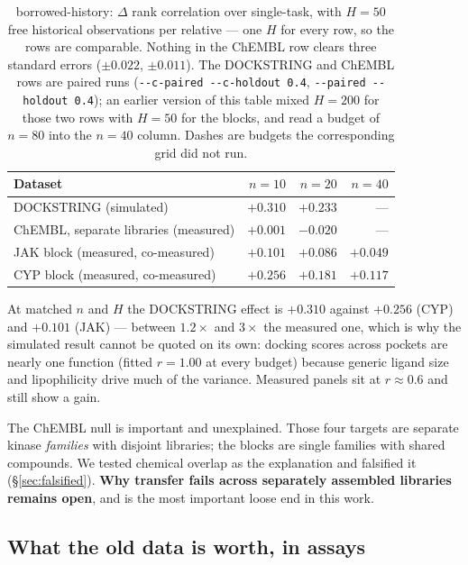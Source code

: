 \documentclass[11pt]{article}
\begin{document}
\begin{table}[ht]
\centering\small
\begin{tabular}{lrrr}
\toprule
Dataset & $n = 10$ & $n = 20$ & $n = 40$ \\
\midrule
DOCKSTRING (simulated)                 & $+0.310$ & $+0.233$ & --- \\
ChEMBL, separate libraries (measured)  & $+0.001$ & $-0.020$ & --- \\
JAK block (measured, co-measured)      & $+0.101$ & $+0.086$ & $+0.049$ \\
CYP block (measured, co-measured)      & $+0.256$ & $+0.181$ & $+0.117$ \\
\bottomrule
\end{tabular}
\caption{borrowed-history: $\Delta$ rank correlation over single-task, with $H = 50$ free
historical observations per relative --- one $H$ for every row, so the rows are
comparable. Nothing in the ChEMBL row clears three standard errors
($\pm 0.022$, $\pm 0.011$). The DOCKSTRING and ChEMBL rows are paired runs
(\texttt{-{}-c-paired -{}-c-holdout 0.4}, \texttt{-{}-paired -{}-holdout 0.4});
an earlier version of this table mixed $H = 200$ for those two rows with
$H = 50$ for the blocks, and read a budget of $n = 80$ into the $n = 40$
column. Dashes are budgets the corresponding grid did not run.}
\label{tab:h1cold}
\end{table}

At matched $n$ and $H$ the DOCKSTRING effect is $+0.310$ against $+0.256$
(CYP) and $+0.101$ (JAK) --- between $1.2\times$ and $3\times$ the measured one,
which is why the simulated result cannot be quoted on its own: docking scores
across pockets are nearly one function (fitted $r = 1.00$ at every budget)
because generic ligand size and lipophilicity drive much of the variance.
Measured panels sit at $r \approx 0.6$ and still show a gain.

The ChEMBL null is important and unexplained. Those four targets are separate
kinase \emph{families} with disjoint libraries; the blocks are single families
with shared compounds. We tested chemical overlap as the explanation and
falsified it (\S\ref{sec:falsified}). \textbf{Why transfer fails across
separately assembled libraries remains open}, and is the most important loose
end in this work.

\subsection{What the old data is worth, in assays}
\end{document}
